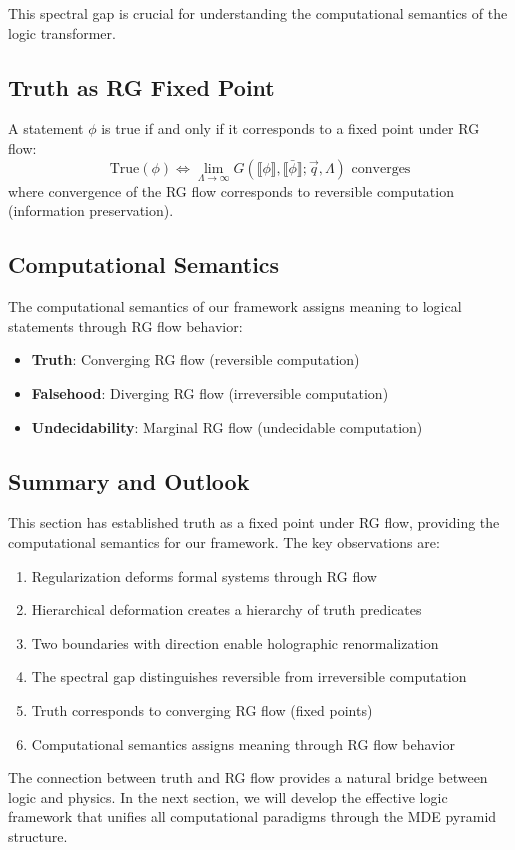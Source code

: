 This spectral gap is crucial for understanding the computational semantics of the logic transformer.

\subsection{Truth as RG Fixed Point}

\begin{theorem}
\label{thm:truth-rg-fixed-point}
A statement $\phi$ is true if and only if it corresponds to a fixed point under RG flow:
\[
\text{True}(\phi) \Leftrightarrow \lim_{\Lambda \to \infty} G(\llbracket\phi\rrbracket, \llbracket\bar{\phi}\rrbracket; \vec{q}, \Lambda) \text{ converges}
\]
where convergence of the RG flow corresponds to reversible computation (information preservation).
\end{theorem}

\subsection{Computational Semantics}

\begin{definition}
\label{def:computational-semantics}
The computational semantics of our framework assigns meaning to logical statements through RG flow behavior:
\begin{itemize}
\item \textbf{Truth}: Converging RG flow (reversible computation)
\item \textbf{Falsehood}: Diverging RG flow (irreversible computation)
\item \textbf{Undecidability}: Marginal RG flow (undecidable computation)
\end{itemize}
\end{definition}

\subsection{Summary and Outlook}

This section has established truth as a fixed point under RG flow, providing the computational semantics for our framework. The key observations are:

\begin{enumerate}
\item Regularization deforms formal systems through RG flow
\item Hierarchical deformation creates a hierarchy of truth predicates
\item Two boundaries with direction enable holographic renormalization
\item The spectral gap distinguishes reversible from irreversible computation
\item Truth corresponds to converging RG flow (fixed points)
\item Computational semantics assigns meaning through RG flow behavior
\end{enumerate}

The connection between truth and RG flow provides a natural bridge between logic and physics. In the next section, we will develop the effective logic framework that unifies all computational paradigms through the MDE pyramid structure.